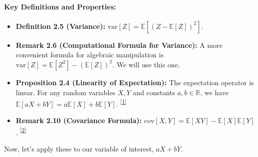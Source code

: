 \documentclass[11pt,a4paper]{article}
\newcommand{\noteLink}[1]{\textsuperscript{[\hyperlink{#1}{\textcolor{blue}{#1}}]}}
\begin{document}
\paragraph{Key Definitions and Properties:}
\begin{itemize}
    \item \textbf{Definition 2.5 (Variance):} $\text{var}[Z] = \mathbb{E}[(Z - \mathbb{E}[Z])^2]$.
    \item \textbf{Remark 2.6 (Computational Formula for Variance):} A more convenient formula for algebraic manipulation is $\text{var}[Z] = \mathbb{E}[Z^2] - (\mathbb{E}[Z])^2$. We will use this one.
    \item \textbf{Proposition 2.4 (Linearity of Expectation):} The expectation operator is linear. For any random variables $X, Y$ and constants $a, b \in \mathbb{R}$, we have $\mathbb{E}[aX + bY] = a\mathbb{E}[X] + b\mathbb{E}[Y]$. \noteLink{1}
    \item \textbf{Remark 2.10 (Covariance Formula):} $\text{cov}[X, Y] = \mathbb{E}[XY] - \mathbb{E}[X]\mathbb{E}[Y]$. \noteLink{2}
\end{itemize}

Now, let's apply these to our variable of interest, $aX+bY$.
\end{document}
